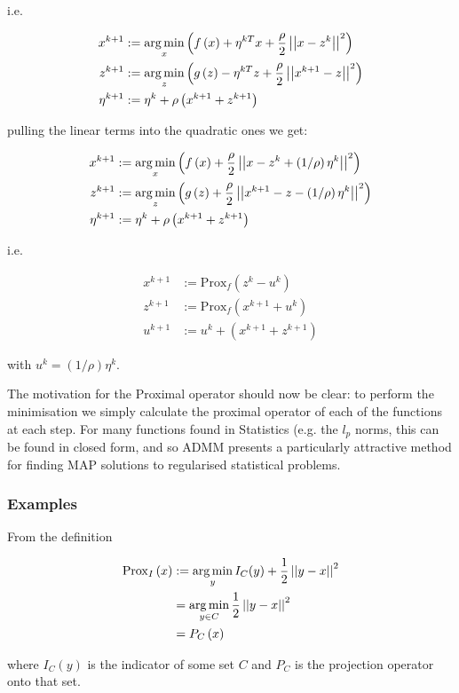 i.e. 

\begin{align}
x^{k+1} &:= \operatorname*{arg\,min}_{x} \left( f\left(x\right) + \eta^{kT}x + \frac{\rho}{2}\left|\left|x - z^k\right|\right|^2 \right) \\
z^{k+1} &:= \operatorname*{arg\,min}_{z} \left( g\left(z\right) - \eta^{kT}z + \frac{\rho}{2}\left|\left|x^{k+1} - z\right|\right|^2 \right)\\
\eta^{k+1} &:= \eta^{k} + \rho \left(x^{k+1} + z^{k+1}\right)
\end{align}

pulling the linear terms into the quadratic ones we get:

\begin{align}
x^{k+1} &:= \operatorname*{arg\,min}_{x} \left( f\left(x\right) +  \frac{\rho}{2}\left|\left|x - z^k + \left(1/\rho\right)\eta^k\right|\right|^2 \right) \\
z^{k+1} &:= \operatorname*{arg\,min}_{z} \left( g\left(z\right) +  \frac{\rho}{2}\left|\left|x^{k+1} - z - \left(1/\rho\right)\eta^k\right|\right|^2 \right)\\
\eta^{k+1} &:= \eta^{k} + \rho \left(x^{k+1} + z^{k+1}\right)
\end{align}

i.e.

\begin{align}
x^{k+1} &:= \mathrm{Prox}_f \left( z^k - u^k\right)\\
z^{k+1} &:= \mathrm{Prox}_f \left(x^{k+1} + u^k\right)  \\
u^{k+1} &:= u^{k} + \left(x^{k+1} + z^{k+1}\right)
\end{align}

with \(u^k = \left(1/\rho\right) \eta^k\).

The motivation for the Proximal operator should now be clear: to perform the minimisation we simply calculate the proximal operator of each of the functions at each step. For many functions found in Statistics (e.g. the \(l_p\) norms, this can be found in closed form, and so ADMM presents a particularly attractive method for finding MAP solutions to regularised statistical problems.

\subsubsection{Examples}

\begin{example}[Indicator]
From the definition 

\begin{align}
\mathrm{Prox}_I\left(x\right) &:=  \operatorname*{arg\,min}_y I_C(y) + \frac{1}{2}\left|\left|y-x\right|\right|^2 \\
& = \operatorname*{arg\,min}_{y \in C} \frac{1}{2}\left|\left|y-x\right|\right|^2 \\
& = P_C\left(x\right)
\end{align}

where \(I_C(y)\) is the indicator of some set \(C\) and \(P_C\) is the projection operator onto that set.
\end{example} 

